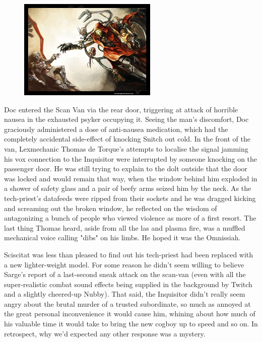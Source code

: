 \begin{figure}
	\begin{center}
		\includegraphics[width=\figwidth]{pics/19/9.png}
	\end{center}
\end{figure}
Doc entered the Scan Van via the rear door, triggering at attack of horrible nausea in the exhausted psyker occupying it. 
Seeing the man's discomfort, Doc graciously administered a dose of anti-nausea medication, which had the completely accidental side-effect of knocking Snitch out cold. 
In the front of the van, Lexmechanic Thomas de Torque's attempts to localise the signal jamming his vox connection to the Inquisitor were interrupted by someone knocking on the passenger door. 
He was still trying to explain to the dolt outside that the door was locked and would remain that way, when the window behind him exploded in a shower of safety glass and a pair of beefy arms seized him by the neck. 
As the tech-priest's datafeeds were ripped from their sockets and he was dragged kicking and screaming out the broken window, he reflected on the wisdom of antagonizing a bunch of people who viewed violence as more of a first resort. 
The last thing Thomas heard, aside from all the las and plasma fire, was a muffled mechanical voice calling "dibs" on his limbs. 
He hoped it was the Omnissiah.

Sciscitat was less than pleased to find out his tech-priest had been replaced with a new lighter-weight model. 
For some reason he didn't seem willing to believe Sarge's report of a last-second sneak attack on the scan-van (even with all the super-realistic combat sound effects being supplied in the background by Twitch and a slightly cheered-up Nubby). 
That said, the Inquisitor didn't really seem angry about the brutal murder of a trusted subordinate, so much as annoyed at the great personal inconvenience it would cause him, whining about how much of his valuable time it would take to bring the new cogboy up to speed and so on. 
In retrospect, why we'd expected any other response was a mystery.


